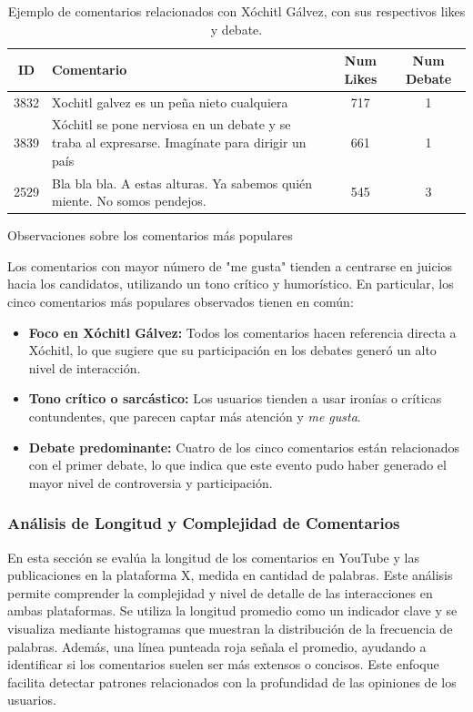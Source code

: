 \documentclass[10pt, a4paper]{article}
\begin{document}
	\begin{table}[H]
		\centering
		\begin{tabular}{|c|p{11cm}|c|c|}
			\hline
			\textbf{ID} & \textbf{Comentario} & \textbf{Num Likes} & \textbf{Num Debate} \\ \hline
			3832 & Xochitl galvez es un peña nieto cualquiera & 717 & 1 \\ \hline
			3839 & Xóchitl se pone nerviosa en un debate y se traba al expresarse. Imagínate para dirigir un país & 661 & 1 \\ \hline
			2529 & Bla bla bla. A estas alturas. Ya sabemos quién miente. No somos pendejos. & 545 & 3 \\ \hline
		\end{tabular}
		\caption{Ejemplo de comentarios relacionados con Xóchitl Gálvez, con sus respectivos likes y debate.}
		\label{tab:comentarios_xochitl2}
	\end{table}
	
	Observaciones sobre los comentarios más populares
	
	Los comentarios con mayor número de "me gusta" tienden a centrarse en juicios hacia los candidatos, utilizando un tono crítico y humorístico. En particular, los cinco comentarios más populares observados tienen en común:
	
	\begin{itemize}
		\item \textbf{Foco en Xóchitl Gálvez:} Todos los comentarios hacen referencia directa a Xóchitl, lo que sugiere que su participación en los debates generó un alto nivel de interacción.
		\item \textbf{Tono crítico o sarcástico:} Los usuarios tienden a usar ironías o críticas contundentes, que parecen captar más atención y \textit{me gusta}.
		\item \textbf{Debate predominante:} Cuatro de los cinco comentarios están relacionados con el primer debate, lo que indica que este evento pudo haber generado el mayor nivel de controversia y participación.
	\end{itemize}
	
	
	\subsubsection{Análisis de Longitud y Complejidad de Comentarios}
	En esta sección se evalúa la longitud de los comentarios en YouTube y las publicaciones en la plataforma X, medida en cantidad de palabras. Este análisis permite comprender la complejidad y nivel de detalle de las interacciones en ambas plataformas. Se utiliza la longitud promedio como un indicador clave y se visualiza mediante histogramas que muestran la distribución de la frecuencia de palabras. Además, una línea punteada roja señala el promedio, ayudando a identificar si los comentarios suelen ser más extensos o concisos. Este enfoque facilita detectar patrones relacionados con la profundidad de las opiniones de los usuarios.
	
\end{document}
